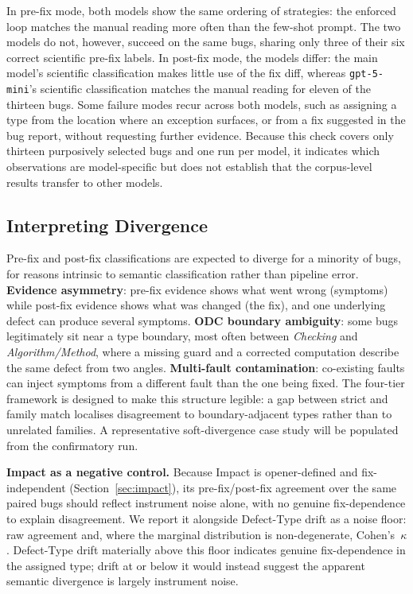 In pre-fix mode, both models show the same ordering of strategies: the enforced
loop matches the manual reading more often than the few-shot prompt. The two
models do not, however, succeed on the same bugs, sharing only three of their six
correct scientific pre-fix labels. In post-fix mode, the models differ: the main
model's scientific classification makes little use of the fix diff, whereas
\texttt{gpt-5-mini}'s scientific classification matches the manual reading for
eleven of the thirteen bugs. Some failure modes recur across both models, such as
assigning a type from the location where an exception surfaces, or from a fix
suggested in the bug report, without requesting further evidence. Because this
check covers only thirteen purposively selected bugs and one run per model, it
indicates which observations are model-specific but does not establish that the
corpus-level results transfer to other models.

\subsection{Interpreting Divergence}
\label{sec:divergence}

Pre-fix and post-fix classifications are expected to diverge for a minority of
bugs, for reasons intrinsic to semantic classification rather than pipeline
error. \textbf{Evidence asymmetry}: pre-fix evidence shows what went wrong
(symptoms) while post-fix evidence shows what was changed (the fix), and one
underlying defect can produce several symptoms. \textbf{ODC boundary ambiguity}: some bugs
legitimately sit near a type boundary, most often between \textit{Checking}
and \textit{Algorithm/Method}, where a missing guard and a corrected computation
describe the same defect from two angles. \textbf{Multi-fault contamination}:
co-existing faults \citep{callaghan2024mf} can inject symptoms from a different
fault than the one being fixed. The four-tier framework is designed to make this
structure legible: a gap between strict and family match localises disagreement
to boundary-adjacent types rather than to unrelated families. A representative
soft-divergence case study will be populated from the confirmatory run.

\textbf{Impact as a negative control.} Because Impact is opener-defined and
fix-independent (Section~\ref{sec:impact}), its pre-fix/post-fix agreement over
the same paired bugs should reflect instrument noise alone, with no genuine
fix-dependence to explain disagreement. We report it alongside Defect-Type
drift as a noise floor: raw agreement \TBD{} and, where the marginal
distribution is non-degenerate, Cohen's~$\kappa$ \TBD{}. Defect-Type drift
materially above this floor indicates genuine fix-dependence in the assigned
type; drift at or below it would instead suggest the apparent semantic
divergence is largely instrument noise.

